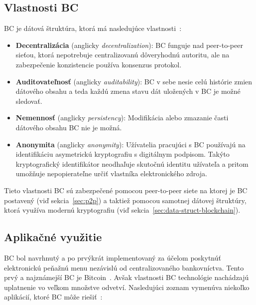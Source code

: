 \subsection{Vlastnosti BC}
BC je dátová štruktúra, ktorá má nasledujúce vlastnosti~\cite{zhengBlockchainOverview}:
\begin{itemize}
	\item \textbf{Decentralizácia} (anglicky \textit{decentralization}): BC funguje nad peer-to-peer sieťou, ktorá nepotrebuje centralizovanú dôveryhodnú autoritu, ale na zabezpečenie konzistencie používa konsenzus protokol.
	\item \textbf{Auditovateľnosť} (anglicky \textit{auditability}): BC v sebe nesie celú histórie zmien dátového obsahu a teda každú zmena stavu dát uložených v BC je možné sledovať.
	\item \textbf{Nemennosť} (anglicky \textit{persistency}): Modifikácia alebo zmazanie časti dátového obsahu BC nie je možná.
	\item \textbf{Anonymita} (anglicky \textit{anonymity}): Užívatelia pracujúci s BC používajú na identifikáciu asymetrickú kryptografiu s digitálnym podpisom. Takýto kryptografický identifikátor neodhaľuje skutočnú identitu užívateľa a pritom umožňuje nepopierateľne určiť vlastníka elektronického zdroja.
\end{itemize}

Tieto vlastnosti BC sú zabezpečené pomocou peer-to-peer siete na ktorej je BC postavený (viď sekcia~\ref{sec:p2p}) a taktiež pomocou samotnej dátovej štruktúry, ktorá využíva modernú kryptografiu (viď sekcia~\ref{sec:data-struct-blockchain}).~\cite{horizenAcademy}

\subsection{Aplikačné využitie}

BC bol navrhnutý a po prvýkrát implementovaný za účelom poskytnúť elektronickú peňažnú menu nezávislú od centralizovaného bankovníctva. Tento prvý a najznámejší BC je Bitcoin~\cite{satoshiBitcoin}. Avšak vlastnosti BC technológie nachádzajú uplatnenie vo veľkom množstve odvetví. Nasledujúci zoznam vymenúva niekoľko aplikácií, ktoré BC môže riešiť~\cite{homoliakBlockchain}:

